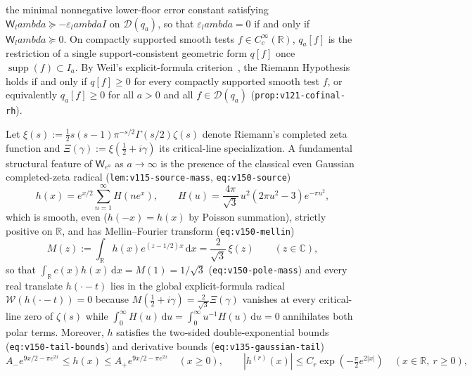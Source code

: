 \documentclass[11pt]{article}
\def\lambda{lambda}%
\theoremstyle{remark}
\newcommand{\dd}{\mathrm d}
\begin{document}
the minimal nonnegative lower-floor error constant satisfying $\mathsf{W}_\lambda \succeq -\varepsilon_\lambda I$ on $\mathcal{D}(q_a)$, so that $\varepsilon_\lambda = 0$ if and only if $\mathsf{W}_\lambda \succeq 0$. On compactly supported smooth tests $f \in C_c^\infty(\mathbb{R})$, $q_a[f]$ is the restriction of a single support-consistent geometric form $q[f]$ once $\operatorname{supp}(f) \subset I_a$. By Weil's explicit-formula criterion~\cite{BurnolExplicit2000,ConnesVanSuijlekom2021,ConnesConsani2023,ConnesConsaniMoscovici2025,Suzuki2026Screw}, the Riemann Hypothesis holds if and only if $q[f] \ge 0$ for every compactly supported smooth test $f$, or equivalently $q_a[f] \ge 0$ for all $a > 0$ and all $f \in \mathcal{D}(q_a)$ (\texttt{prop:v121-cofinal-rh}).

Let $\xi(s) := \tfrac{1}{2}s(s-1)\pi^{-s/2}\Gamma(s/2)\zeta(s)$ denote Riemann's completed zeta function and $\Xi(\gamma) := \xi(\tfrac{1}{2} + i\gamma)$ its critical-line specialization. A fundamental structural feature of $\mathsf{W}_{e^a}$ as $a \to \infty$ is the presence of the classical even Gaussian completed-zeta radical (\texttt{lem:v115-source-mass}, \texttt{eq:v150-source})
\begin{equation}\label{eq:gaussian-radical}
  h(x) = e^{x/2}\sum_{n=1}^\infty H(ne^x), \qquad H(u) = \frac{4\pi}{\sqrt{3}}\,u^2(2\pi u^2 - 3)e^{-\pi u^2},
\end{equation}
which is smooth, even ($h(-x) = h(x)$ by Poisson summation), strictly positive on $\mathbb{R}$, and has Mellin--Fourier transform (\texttt{eq:v150-mellin})
\begin{equation}\label{eq:v150-mellin}
  M(z) := \int_{\mathbb{R}} h(x)e^{(z-1/2)x}\,\dd x = \frac{2}{\sqrt{3}}\,\xi(z) \qquad (z \in \mathbb{C}),
\end{equation}
so that $\int_{\mathbb{R}} c(x)h(x)\,\dd x = M(1) = 1/\sqrt{3}$ (\texttt{eq:v150-pole-mass}) and every real translate $h(\cdot - t)$ lies in the global explicit-formula radical $\mathcal{W}(h(\cdot - t)) = 0$ because $M(\tfrac{1}{2} + i\gamma) = \frac{2}{\sqrt{3}}\Xi(\gamma)$ vanishes at every critical-line zero of $\zeta(s)$ while $\int_0^\infty H(u)\,\dd u = \int_0^\infty u^{-1}H(u)\,\dd u = 0$ annihilates both polar terms. Moreover, $h$ satisfies the two-sided double-exponential bounds (\texttt{eq:v150-tail-bounds}) and derivative bounds (\texttt{eq:v135-gaussian-tail})
\begin{equation}\label{eq:v135-gaussian-tail}
  A_- e^{9x/2 - \pi e^{2x}} \le h(x) \le A_+ e^{9x/2 - \pi e^{2x}} \quad (x \ge 0), \qquad |h^{(r)}(x)| \le C_r \exp\!\left(-\tfrac{\pi}{2}e^{2|x|}\right) \quad (x \in \mathbb{R},\ r \ge 0),
\end{equation}
\end{document}
